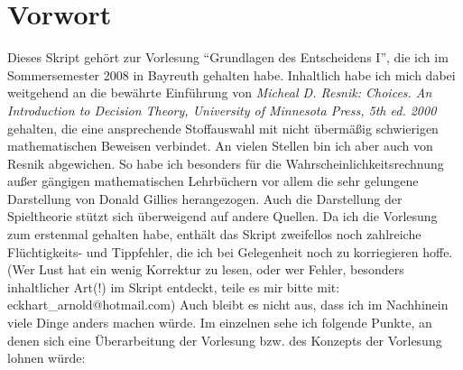 \chapter{Vorwort}

Dieses Skript gehört zur Vorlesung "`Grundlagen des Entscheidens I"', die ich im
Sommersemester 2008 in Bayreuth gehalten habe. Inhaltlich habe ich mich dabei
weitgehend an die bewährte Einführung von {\em Micheal D. Resnik: Choices. An
Introduction to Decision Theory, University of Minnesota Press, 5th ed. 2000
\cite{resnik:1987}} gehalten, die eine ansprechende Stoffauswahl mit nicht
übermäßig schwierigen mathematischen Beweisen verbindet. An vielen Stellen bin
ich aber auch von Resnik abgewichen. So habe ich besonders für die
Wahrscheinlichkeitsrechnung außer gängigen mathematischen Lehrbüchern vor allem
die sehr gelungene Darstellung von Donald Gillies \cite{gillies:2000}
herangezogen. Auch die Darstellung der Spieltheorie stützt sich überweigend auf
andere Quellen. Da ich die Vorlesung zum erstenmal gehalten habe, enthält das
Skript zweifellos noch zahlreiche Flüchtigkeits- und Tippfehler, die ich bei
Gelegenheit noch zu korriegieren hoffe. (Wer Lust hat ein wenig Korrektur zu
lesen, oder wer Fehler, besonders inhaltlicher Art(!) im Skript entdeckt, teile
es mir bitte mit: eckhart\_arnold@hotmail.com) Auch bleibt es nicht aus, dass
ich im Nachhinein viele Dinge anders machen würde. Im einzelnen sehe ich folgende Punkte, an denen sich eine Überarbeitung der Vorlesung bzw. des Konzepts der Vorlesung lohnen würde:

